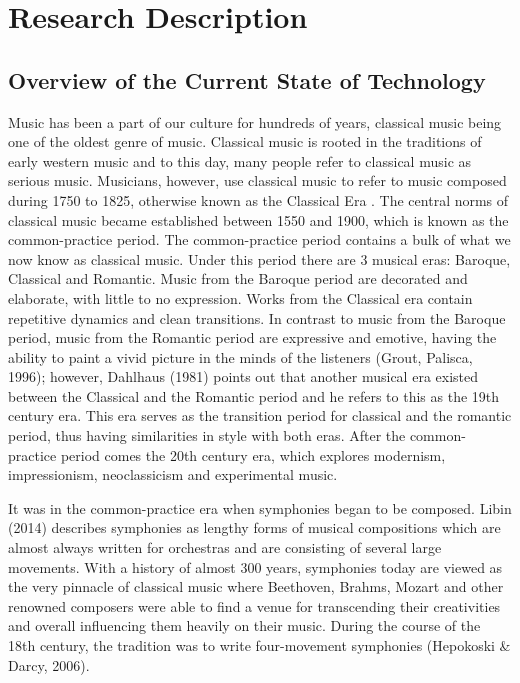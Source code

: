 %
%
%                 

\chapter{Research Description}
\label{sec:researchdesc}    %

\section{Overview of the Current State of Technology}
\label{sec:overview}
Music has been a part of our culture for hundreds of years, classical music being one of the oldest genre of music. Classical music is rooted in the traditions of early western music and to this day, many people refer to classical music as serious music. Musicians, however, use classical music to refer to music composed during 1750 to 1825, otherwise known as the Classical Era \cite{bernstein}. The central norms of classical music became established between 1550 and 1900, which is known as the common-practice period. The common-practice period contains a bulk of what we now know as classical music. Under this period there are 3 musical eras: Baroque, Classical and Romantic. Music from the Baroque period are decorated and elaborate, with little to no expression. Works from the Classical era contain repetitive dynamics and clean transitions. In contrast to music from the Baroque period, music from the Romantic period are expressive and emotive, having the ability to paint a vivid picture in the minds of the listeners (Grout, Palisca, 1996); however, Dahlhaus (1981) points out that another musical era existed between the Classical and the Romantic period and he refers to this as the 19th century era. This era serves as the transition period for classical and the romantic period, thus having similarities in style with both eras. After the common-practice period comes the 20th century era, which explores modernism, impressionism, neoclassicism and experimental music. 

It was in the common-practice era when symphonies began to be composed. Libin (2014) describes symphonies as lengthy forms of musical compositions which are almost always written for orchestras and are consisting of several large movements. With a history of almost 300 years, symphonies today are viewed as the very pinnacle of classical music where Beethoven, Brahms, Mozart and other renowned composers were able to find a venue for transcending their creativities and overall influencing them heavily on their music. During the course of the 18th century, the tradition was  to write four-movement symphonies (Hepokoski \& Darcy, 2006).

